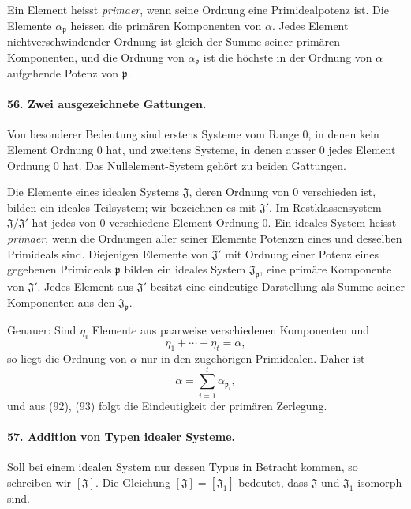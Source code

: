 \documentclass[11pt]{article}
\begin{document}
Ein Element heisst \emph{primaer}, wenn seine Ordnung eine Primidealpotenz ist. Die Elemente $\alpha_{\mathfrak p}$ heissen die primären Komponenten von $\alpha$. Jedes Element nichtverschwindender Ordnung ist gleich der Summe seiner primären Komponenten, und die Ordnung von $\alpha_{\mathfrak p}$ ist die höchste in der Ordnung von $\alpha$ aufgehende Potenz von $\mathfrak p$.

\paragraph{56. Zwei ausgezeichnete Gattungen.}
Von besonderer Bedeutung sind erstens Systeme vom Range $0$, in denen kein Element Ordnung $0$ hat, und zweitens Systeme, in denen ausser $0$ jedes Element Ordnung $0$ hat. Das Nullelement-System gehört zu beiden Gattungen.

Die Elemente eines idealen Systems $\mathfrak J$, deren Ordnung von $0$ verschieden ist, bilden ein ideales Teilsystem; wir bezeichnen es mit $\mathfrak J'$. Im Restklassensystem $\mathfrak J/\mathfrak J'$ hat jedes von $0$ verschiedene Element Ordnung $0$. Ein ideales System heisst \emph{primaer}, wenn die Ordnungen aller seiner Elemente Potenzen eines und desselben Primideals sind. Diejenigen Elemente von $\mathfrak J'$ mit Ordnung einer Potenz eines gegebenen Primideals $\mathfrak p$ bilden ein ideales System $\mathfrak J_{\mathfrak p}$, eine primäre Komponente von $\mathfrak J'$. Jedes Element aus $\mathfrak J'$ besitzt eine eindeutige Darstellung als Summe seiner Komponenten aus den $\mathfrak J_{\mathfrak p}$.

Genauer: Sind $\eta_i$ Elemente aus paarweise verschiedenen Komponenten und
\begin{equation}
  \eta_1+\cdots+\eta_t=\alpha,
\tag{92}
\end{equation}
so liegt die Ordnung von $\alpha$ nur in den zugehörigen Primidealen. Daher ist
\begin{equation}
  \alpha=\sum_{i=1}^{t}\alpha_{\mathfrak p_i},
\tag{93}
\end{equation}
und aus (92), (93) folgt die Eindeutigkeit der primären Zerlegung.

\paragraph{57. Addition von Typen idealer Systeme.}
Soll bei einem idealen System nur dessen Typus in Betracht kommen, so schreiben wir $[\mathfrak J]$. Die Gleichung $[\mathfrak J]=[\mathfrak J_1]$ bedeutet, dass $\mathfrak J$ und $\mathfrak J_1$ isomorph sind.
\end{document}
